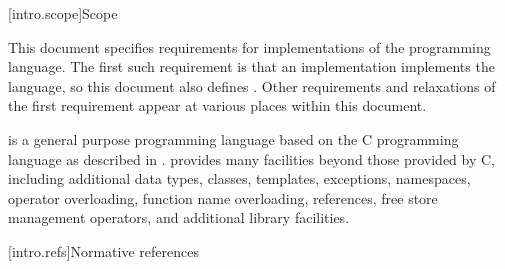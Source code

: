 
\clearpage
\bigskip\noindent{}
\bigskip\bigskip

\begingroup
\let\clearpage\relax
{}[intro.scope]{Scope}
\endgroup
{}
\thispagestyle{cpppageone}

\pnum
{}%
This document specifies requirements for implementations
of the \Cpp{} programming language. The first such requirement is that
an implementation implements the language, so this document also
defines \Cpp{}. Other requirements and relaxations of the first
requirement appear at various places within this document.

\pnum
\Cpp{} is a general purpose programming language based on the C
programming language as described in \IsoC{}.
\Cpp{} provides many facilities
beyond those provided by C, including additional data types,
classes, templates, exceptions, namespaces, operator
overloading, function name overloading, references, free store
management operators, and additional library facilities.%

[intro.refs]{Normative references}%
%

